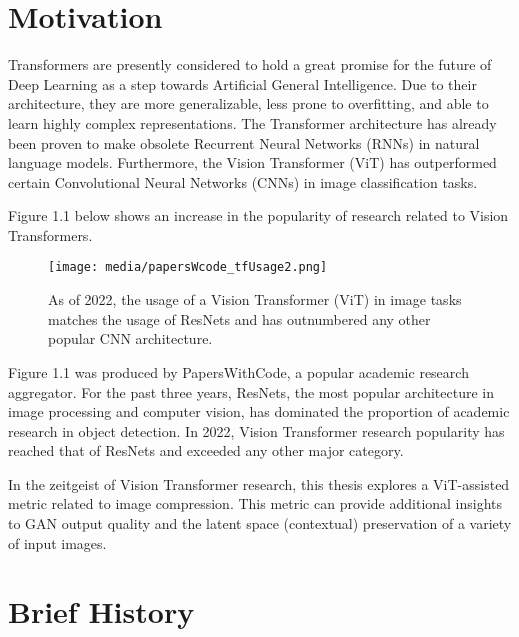 
\section{Motivation}

Transformers are presently considered to hold a great promise for the future of Deep Learning
as a step towards Artificial General Intelligence.
Due to their architecture, they are more generalizable, less prone to overfitting, and able 
to learn highly complex representations. The Transformer architecture has already been proven 
to make obsolete Recurrent Neural Networks (RNNs) in natural language models. Furthermore, the 
Vision Transformer (ViT) has outperformed certain Convolutional Neural Networks (CNNs) in image classification tasks. \citep{dosovitskiy2020vit}

Figure 1.1 below shows an increase in the popularity of research related to Vision Transformers.

\begin{figure}[H]
	\begin{center}
	\texttt{[image: media/papersWcode\_tfUsage2.png]}
	\end{center}
	\caption[Historical Usage of ViT in Image Tasks]{As of 2022, the usage of a Vision Transformer (ViT) in image 
	tasks matches the usage of ResNets and has outnumbered any other popular CNN architecture.
	\citep{PapersOverTime}}
	\end{figure}

Figure 1.1 was produced by PapersWithCode, a popular academic research aggregator. For the past three years, 
ResNets, the most popular architecture in image processing and computer vision, has dominated the proportion
of academic research in object detection. In 2022, Vision Transformer research popularity has reached
that of ResNets and exceeded any other major category.


In the zeitgeist of Vision Transformer research, this thesis explores a ViT-assisted metric related to 
image compression. This metric can provide additional insights to GAN output quality 
and the latent space (contextual) preservation of a variety of input images.




\section{Brief History}

